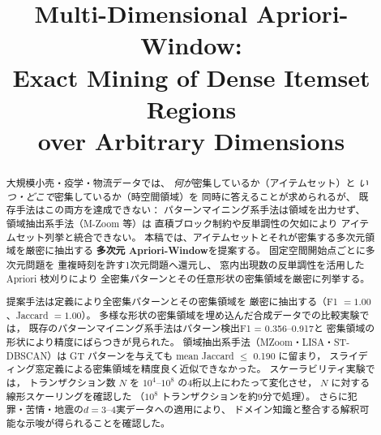 \documentclass[conference]{IEEEtran}
\begin{document}

\title{Multi-Dimensional Apriori-Window: \\
Exact Mining of Dense Itemset Regions\\
over Arbitrary Dimensions}

\author{
  \and
}

\maketitle
\pagestyle{plain}

\begin{abstract}
大規模小売・疫学・物流データでは、
\emph{何が}密集しているか（アイテムセット）と
\emph{いつ・どこで}密集しているか（時空間領域）を
同時に答えることが求められるが、
既存手法はこの両方を達成できない：
パターンマイニング系手法は領域を出力せず、
領域抽出系手法（M-Zoom 等）は
直積ブロック制約や反単調性の欠如により
アイテムセット列挙と統合できない。
本稿では、アイテムセットとそれが密集する多次元領域を厳密に抽出する
\textbf{多次元 Apriori-Window}を提案する。
固定空間開始点ごとに多次元問題を
重複時刻を許す1次元問題へ還元し、
窓内出現数の反単調性を活用した Apriori 枝刈りにより
全密集パターンとその任意形状の密集領域を厳密に列挙する。

提案手法は定義により全密集パターンとその密集領域を
厳密に抽出する（F1 $= 1.00$、Jaccard $= 1.00$）。
多様な形状の密集領域を埋め込んだ合成データでの比較実験では，
既存のパターンマイニング系手法はパターン検出F1 = 0.356--0.917と
密集領域の形状により精度にばらつきが見られた。
領域抽出系手法（MZoom・LISA・ST-DBSCAN）は
GT パターンを与えても mean Jaccard $\leq$ 0.190 に留まり，
スライディング窓定義による密集領域を精度良く近似できなかった。
スケーラビリティ実験では，
トランザクション数 $N$ を $10^4$--$10^8$ の4桁以上にわたって変化させ，
$N$ に対する線形スケーリングを確認した
（$10^8$ トランザクションを約9分で処理）。
さらに犯罪・苦情・地震の$d{=}3$--$4$実データへの適用により、
ドメイン知識と整合する解釈可能な示唆が得られることを確認した。
\end{abstract}
\end{document}
